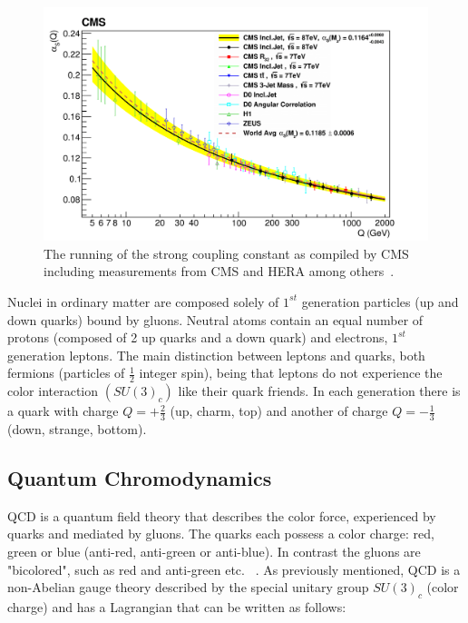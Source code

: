 \begin{figure}[htb]
\centering
\includegraphics[width=.70\textwidth]{visuals/strong-coupling-cms2.png}
\caption{The running of the strong coupling constant as compiled by CMS including measurements from CMS and HERA among others~\cite{CMS:2014mna}.}
\label{fig:alphas}
\end{figure}












Nuclei in ordinary matter are composed solely of $1^{st}$ generation particles (up and down quarks) bound by gluons. Neutral atoms contain an equal number of protons (composed of 2 up quarks and a down quark) and electrons, $1^{st}$ generation leptons. The main distinction between leptons and quarks, both fermions (particles of $\frac{1}{2}$ integer spin), being that leptons do not experience the color interaction $(SU(3)_c)$ like their quark friends. In each generation there is a quark with charge $Q = + \frac{2}{3}$ (up, charm, top) and another of charge $Q = - \frac{1}{3}$ (down, strange, bottom).





\subsection{Quantum Chromodynamics}\label{secQCD}


QCD is a quantum field theory that describes the color force, experienced by quarks and mediated by gluons. The quarks each possess a color charge: red, green or blue (anti-red, anti-green or anti-blue). In contrast the gluons are "bicolored", such as red and anti-green etc. ~\cite{Griffiths:111880}. As previously mentioned, QCD is a non-Abelian gauge theory described by the special unitary group $SU(3)_c$ (color charge) and has a Lagrangian that can be written as follows:\newline


